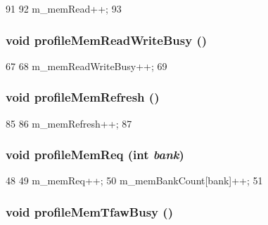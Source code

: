 \begin{DoxyCode}
91 {
92     m_memRead++;
93 }
\end{DoxyCode}
\hypertarget{classMemCntrlProfiler_acb3938ae0f54dbc477209f4437ada024}{
\subsubsection[{profileMemReadWriteBusy}]{\setlength{\rightskip}{0pt plus 5cm}void profileMemReadWriteBusy ()}}
\label{classMemCntrlProfiler_acb3938ae0f54dbc477209f4437ada024}



\begin{DoxyCode}
67 {
68     m_memReadWriteBusy++;
69 }
\end{DoxyCode}
\hypertarget{classMemCntrlProfiler_a40e2dc0236a3bc753d24a2bf77dc3b9f}{
\subsubsection[{profileMemRefresh}]{\setlength{\rightskip}{0pt plus 5cm}void profileMemRefresh ()}}
\label{classMemCntrlProfiler_a40e2dc0236a3bc753d24a2bf77dc3b9f}



\begin{DoxyCode}
85 {
86     m_memRefresh++;
87 }
\end{DoxyCode}
\hypertarget{classMemCntrlProfiler_a640cba10e9673e8081ddc1e8fcf2a0c9}{
\subsubsection[{profileMemReq}]{\setlength{\rightskip}{0pt plus 5cm}void profileMemReq (int {\em bank})}}
\label{classMemCntrlProfiler_a640cba10e9673e8081ddc1e8fcf2a0c9}



\begin{DoxyCode}
48 {
49     m_memReq++;
50     m_memBankCount[bank]++;
51 }
\end{DoxyCode}
\hypertarget{classMemCntrlProfiler_a32ce62393c41865363706bd304a6c376}{
\subsubsection[{profileMemTfawBusy}]{\setlength{\rightskip}{0pt plus 5cm}void profileMemTfawBusy ()}}
\label{classMemCntrlProfiler_a32ce62393c41865363706bd304a6c376}



